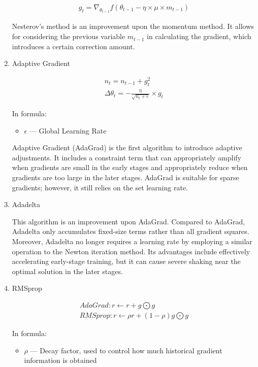 \documentclass[10pt,journal,compsoc]{IEEEtran}
\begin{document}
\begin{enumerate}
\begin{align}
    g_t = \nabla_{\theta_{t-1}} f(\theta_{t-1} - \eta \times \mu \times m_{t-1})
\end{align}

Nesterov's method is an improvement upon the momentum method. It allows for considering the previous variable $m_{t-1}$ in calculating the gradient, which introduces a certain correction amount.

    \item Adaptive Gradient

\begin{align}
    n_t = n_{t-1} + g_t^2 \\
    \Delta \theta_t = - \frac{\eta}
                             {\sqrt{n_t + \epsilon}} \times g_t
\end{align}

In formula:

\begin{itemize}[label={}]
    \item $\epsilon$ --- Global Learning Rate
\end{itemize}

Adaptive Gradient (AdaGrad) is the first algorithm to introduce adaptive adjustments. It includes a constraint term that can appropriately amplify when gradients are small in the early stages and appropriately reduce when gradients are too large in the later stages. AdaGrad is suitable for sparse gradients; however, it still relies on the set learning rate.

    \item Adadelta

This algorithm is an improvement upon AdaGrad. Compared to AdaGrad, Adadelta only accumulates fixed-size terms rather than all gradient squares. Moreover, Adadelta no longer requires a learning rate by employing a similar operation to the Newton iteration method. Its advantages include effectively accelerating early-stage training, but it can cause severe shaking near the optimal solution in the later stages.

    \item RMSprop

\begin{align}
    AdaGrad: r \gets r+g \bigodot g \\
    RMSprop: r \gets \rho r + (1 - \rho)g \bigodot g
\end{align}

In formula:

\begin{itemize}[label={}]
    \item $\rho$ --- Decay factor, used to control how much historical gradient information is obtained
\end{itemize}


\end{enumerate}
\end{document}
